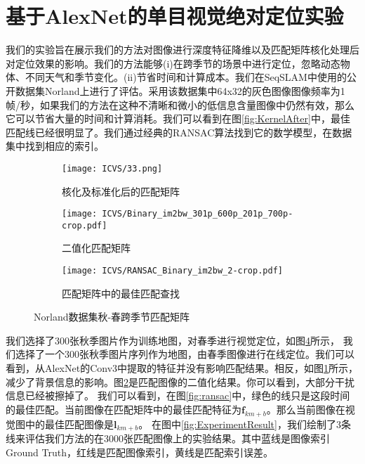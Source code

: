 \section{基于AlexNet的单目视觉绝对定位实验}
我们的实验旨在展示我们的方法对图像进行深度特征降维以及匹配矩阵核化处理后对定位效果的影响。我们的方法能够(i)在跨季节的场景中进行定位，忽略动态物体、不同天气和季节变化。(ii)节省时间和计算成本。我们在SeqSLAM中使用的公开数据集Norland上进行了评估\cite{milford2012seqslam}。采用该数据集中64x32的灰色图像图像频率为1帧/秒，如果我们的方法在这种不清晰和微小的低信息含量图像中仍然有效，那么它可以节省大量的时间和计算消耗。我们可以看到在图\ref{fig:KernelAfter}中，最佳匹配线已经很明显了。我们通过经典的RANSAC算法找到它的数学模型，在数据集中找到相应的索引。
\begin{figure}[h]
\centering
\begin{subfigure}[h]{0.23\textwidth} 
  \texttt{[image: ICVS/33.png]}
  \label{fig:MatchingMatrix}
    \caption{核化及标准化后的匹配矩阵}
\end{subfigure}
\begin{subfigure}[h]{0.23\textwidth} 
  \texttt{[image: ICVS/Binary\_im2bw\_301p\_600p\_201p\_700p-crop.pdf]}
  \label{fig:Binary}
  \caption{二值化匹配矩阵}
\end{subfigure}
\begin{subfigure}[h]{0.23\textwidth} 
  \texttt{[image: ICVS/RANSAC\_Binary\_im2bw\_2-crop.pdf]}
  \label{fig:RANSAC}
    \caption{匹配矩阵中的最佳匹配查找}
\end{subfigure}
\label{fig:ImageProcessing}
\caption{Norland数据集秋-春跨季节匹配矩阵}
\end{figure}
我们选择了300张秋季图片作为训练地图，对春季进行视觉定位，如图\ref{fig:ImageProcessing}所示，
我们选择了一个300张秋季图片序列作为地图，由春季图像进行在线定位。我们可以看到，从AlexNet的Conv3中提取的特征并没有影响匹配结果。相反，如图\ref{fig:MatchingMatrix}所示，减少了背景信息的影响。图\ref{fig:Binary}是匹配图像的二值化结果。你可以看到，大部分干扰信息已经被擦掉了。%
我们可以看到，在图\ref{fig:ransac}中，绿色的线只是这段时间的最佳匹配。当前图像在匹配矩阵中的最佳匹配特征为$\mathbf{f}_{km+b}$。那么当前图像在视觉图中的最佳匹配图像是$\mathbf{l}_{km+b}$。
在图中\ref{fig:ExperimentResult}，我们绘制了3条线来评估我们方法的在3000张匹配图像上的实验结果。其中蓝线是图像索引Ground Truth，红线是匹配图像索引，黄线是匹配索引误差。


